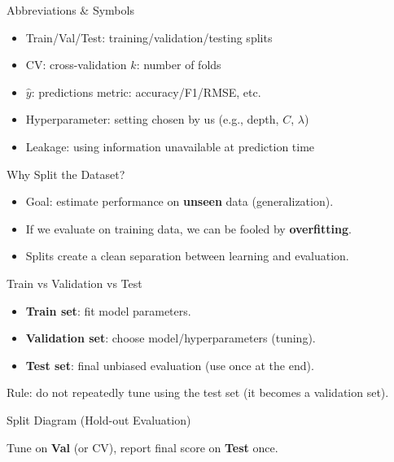 \documentclass[aspectratio=169]{beamer}
\begin{document}
\begin{frame}{Abbreviations \& Symbols}
  \begin{itemize}[<+->]
    \item Train/Val/Test: training/validation/testing splits
    \item CV: cross-validation \hfill $k$: number of folds
    \item $\hat{y}$: predictions \hfill metric: accuracy/F1/RMSE, etc.
    \item Hyperparameter: setting chosen by us (e.g., depth, $C$, $\lambda$)
    \item Leakage: using information unavailable at prediction time
  \end{itemize}
\end{frame}

\begin{frame}{Why Split the Dataset?}
  \begin{itemize}[<+->]
    \item Goal: estimate performance on \textbf{unseen} data (generalization).
    \item If we evaluate on training data, we can be fooled by \textbf{overfitting}.
    \item Splits create a clean separation between learning and evaluation.
  \end{itemize}
\end{frame}

\begin{frame}{Train vs Validation vs Test}
  \begin{itemize}[<+->]
    \item \textbf{Train set}: fit model parameters.
    \item \textbf{Validation set}: choose model/hyperparameters (tuning).
    \item \textbf{Test set}: final unbiased evaluation (use once at the end).
  \end{itemize}
  \vspace{0.4em}
  Rule: do not repeatedly tune using the test set (it becomes a validation set).
\end{frame}

\begin{frame}{Split Diagram (Hold-out Evaluation)}
  \centering
  \vspace{0.4em}
  \small Tune on \textbf{Val} (or CV), report final score on \textbf{Test} once.
\end{frame}
\end{document}
